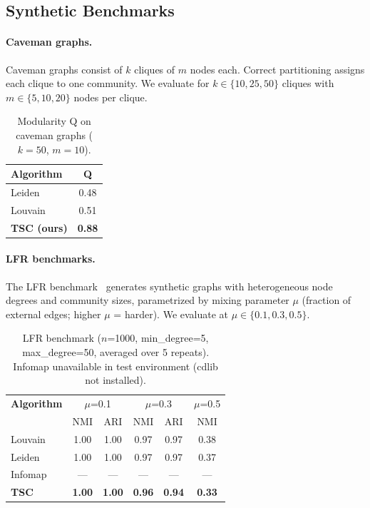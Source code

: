 \documentclass[10pt,twocolumn]{article}
\begin{document}
\subsection{Synthetic Benchmarks}

\paragraph{Caveman graphs.}
Caveman graphs consist of $k$ cliques of $m$ nodes each. Correct partitioning assigns
each clique to one community. We evaluate for $k \in \{10, 25, 50\}$ cliques with
$m \in \{5, 10, 20\}$ nodes per clique.

\begin{table}[h]
\small\centering
\caption{Modularity Q on caveman graphs ($k=50$, $m=10$).}
\label{tab:caveman}
\begin{tabular}{lc}
\toprule
\textbf{Algorithm} & \textbf{Q} \\
\midrule
Leiden~\cite{traag2019louvain}     & 0.48 \\
Louvain~\cite{blondel2008louvain}        & 0.51 \\
\textbf{TSC (ours)}               & \textbf{0.88} \\
\bottomrule
\end{tabular}
\end{table}

\paragraph{LFR benchmarks.}
The LFR benchmark~\cite{lancichinetti2009} generates synthetic graphs with heterogeneous
node degrees and community sizes, parametrized by mixing parameter $\mu$
(fraction of external edges; higher $\mu$ = harder). We evaluate at $\mu \in \{0.1, 0.3, 0.5\}$.

\begin{table}[h]
\small\centering
\caption{LFR benchmark ($n$=1000, min\_degree=5, max\_degree=50, averaged over 5 repeats). Infomap unavailable in test environment (cdlib not installed).}
\label{tab:lfr}
\begin{tabular}{lccccc}
\toprule
\textbf{Algorithm} & \multicolumn{2}{c}{$\mu$=0.1} & \multicolumn{2}{c}{$\mu$=0.3} & $\mu$=0.5 \\
                   & NMI & ARI & NMI & ARI & NMI \\
\midrule
Louvain            & 1.00 & 1.00 & 0.97 & 0.97 & 0.38 \\
Leiden             & 1.00 & 1.00 & 0.97 & 0.97 & 0.37 \\
Infomap            & --- & --- & --- & --- & --- \\
\textbf{TSC}       & \textbf{1.00} & \textbf{1.00}
                   & \textbf{0.96} & \textbf{0.94}
                   & \textbf{0.33} \\
\bottomrule
\end{tabular}
\end{table}
\end{document}

